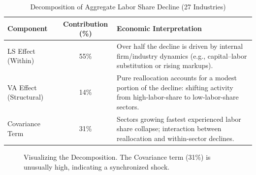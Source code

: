 \documentclass[12pt]{article}
\begin{document}
\begin{table}[!htbp]
\centering
\begin{minipage}{\textwidth}
\caption{Decomposition of Aggregate Labor Share Decline (27 Industries)}
\label{tab:decomp}
\centering
\begin{tabularx}{\textwidth}{@{}l c Y@{}}
\toprule
\textbf{Component} & \textbf{Contribution (\%)} & \textbf{Economic Interpretation} \\
\midrule
LS Effect (Within) & 55\% & Over half the decline is driven by internal firm/industry dynamics (e.g., capital–labor substitution or rising markups). \\
[6pt]
VA Effect (Structural) & 14\% & Pure reallocation accounts for a modest portion of the decline: shifting activity from high-labor-share to low-labor-share sectors. \\
[6pt]
Covariance Term & 31\% & Sectors growing fastest experienced labor share collapse; interaction between reallocation and within-sector declines. \\
\bottomrule
\end{tabularx}
\end{minipage}
\end{table}

\begin{figure}[H]
\centering
{}
\caption{Visualizing the Decomposition. The Covariance term (31\%) is unusually high, indicating a synchronized shock.}
\label{fig:decomp}
\end{figure}
\end{document}
